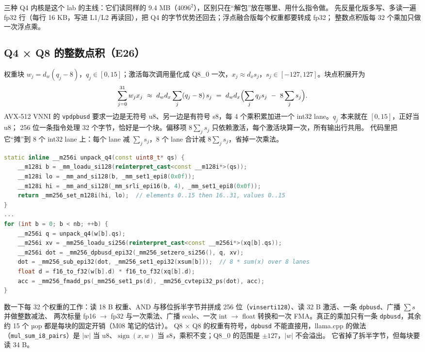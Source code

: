\documentclass[11pt,a4paper]{ctexart}
\begin{document}
三种 Q4 内核是这个 lab 的主线：它们读同样的 9.4 MB（$4096^2$），区别只在“解包”放在哪里、用什么指令做。
先反量化版多写、多读一遍 fp32 行（每行 16 KB，写进 L1/L2 再读回），把 Q4 的字节优势还回去；浮点融合版每个权重都要转成 fp32；
整数点积版每 32 个乘加只做一次浮点乘。

\subsection{Q4 × Q8 的整数点积（E26）}\label{sec:vnni}

权重块 $w_j = d_w (q_j - 8)$，$q_j \in [0, 15]$；激活每次调用量化成 Q8\_0 一次，$x_j \approx d_x s_j$，$s_j \in [-127, 127]$。块点积展开为
\begin{equation}
\sum_{j=0}^{31} w_j x_j \ \approx\ d_w d_x \sum_j (q_j - 8)\, s_j \ =\ d_w d_x \Bigl(\sum_j q_j s_j \ -\ 8 \sum_j s_j\Bigr).
\label{eq:e26}
\end{equation}
AVX-512 VNNI 的 \texttt{vpdpbusd} 要求一边是无符号 u8、另一边是有符号 s8，每 4 个乘积累加进一个 int32 lane。$q_j$ 本来就在 $[0, 15]$，正好当 u8；
256 位一条指令处理 32 个字节，恰好是一个块。偏移项 $8\sum_j s_j$ 只依赖激活，每个激活块算一次，所有输出行共用。
代码里把它“摊”到 8 个 int32 lane 上：每个 lane 减 $\sum_j s_j$，8 个 lane 合计减 $8\sum_j s_j$，省掉一次乘法。

\begin{lstlisting}[language=C++,caption={\texttt{cpp/gemv.cpp} 中 Q4 × Q8 内核的块内循环（节选）},label={lst:vnni}]
static inline __m256i unpack_q4(const uint8_t* qs) {
    __m128i b = _mm_loadu_si128(reinterpret_cast<const __m128i*>(qs));
    __m128i lo = _mm_and_si128(b, _mm_set1_epi8(0x0f));
    __m128i hi = _mm_and_si128(_mm_srli_epi16(b, 4), _mm_set1_epi8(0x0f));
    return _mm256_set_m128i(hi, lo);  // elements 0..15 then 16..31, values 0..15
}
...
for (int b = 0; b < nb; ++b) {
    __m256i q = unpack_q4(w[b].qs);
    __m256i xv = _mm256_loadu_si256(reinterpret_cast<const __m256i*>(xq[b].qs));
    __m256i dot = _mm256_dpbusd_epi32(_mm256_setzero_si256(), q, xv);
    dot = _mm256_sub_epi32(dot, _mm256_set1_epi32(xsum[b]));  // 8 * sum(x) over 8 lanes
    float d = f16_to_f32(w[b].d) * f16_to_f32(xq[b].d);
    acc = _mm256_fmadd_ps(_mm256_set1_ps(d), _mm256_cvtepi32_ps(dot), acc);
}
\end{lstlisting}

数一下每 32 个权重的工作：读 18 B 权重、AND 与移位拆半字节并拼成 256 位（\texttt{vinserti128}）、读 32 B 激活、一条 \texttt{dpbusd}、广播 $\sum s$ 并做整数减法、
两次标量 fp16 $\to$ fp32 与一次乘法、广播 scale、一次 int $\to$ float 转换和一次 FMA。真正的乘加只有一条 \texttt{dpbusd}，其余约 15 个 µop 都是每块的固定开销（M08 笔记的估计）。
Q8 × Q8 的权重有符号，\texttt{dpbusd} 不能直接用，llama.cpp 的做法（\texttt{mul\_sum\_i8\_pairs}）是 $|w|$ 当 u8、$\operatorname{sign}(x, w)$ 当 s8，乘积不变；Q8\_0 的范围是 $\pm127$，$|w|$ 不会溢出。
它省掉了拆半字节，但每块要读 34 B。
\end{document}

